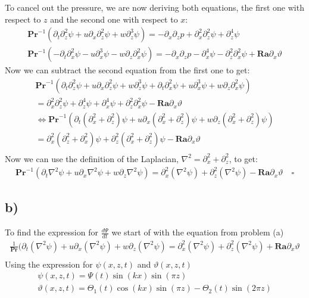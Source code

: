 \documentclass{article}
\renewcommand{\Pr}{\textbf{Pr}}
\newcommand{\Ra}{\textbf{Ra}}
\begin{document}
To cancel out the pressure, we are now deriving both equations, the first one with respect to $z$ and the second one with respect to $x$:
\begin{align*}
    \textbf{Pr}^{-1}(\partial _t \partial^2_z \psi+ u \partial_x\partial^2_z \psi+w \partial^3_z \psi)=-\partial _{x}\partial_zp+\partial ^2_x\partial_z^2\psi+\partial ^4_z\psi\\
    \textbf{Pr}^{-1}(-\partial _t \partial^2_x \psi-u \partial^3_x \psi-w \partial_z \partial^2_x \psi)=-\partial _{x}\partial_zp-\partial ^4_x\psi-\partial ^2_z\partial _x^2\psi+\textbf{Ra}\partial _x\vartheta
\end{align*}
Now we can subtract the second equation from the first one to get:
\begin{align*}
    \textbf{Pr}^{-1}(\partial _t \partial^2_z \psi+ u \partial_x\partial^2_z \psi+w \partial^3_z \psi+\partial _t \partial^2_x \psi+u \partial^3_x \psi+w \partial_z \partial^2_x \psi)\\
    =\partial ^2_x\partial_z^2\psi+\partial ^4_z\psi+\partial ^4_x\psi+\partial ^2_z\partial _x^2\psi-\textbf{Ra}\partial _x\vartheta\\
    \Leftrightarrow \textbf{Pr}^{-1}(\partial _t (\partial^2_x+ \partial^2_z) \psi+ u \partial_x(\partial_x^2+\partial_z^2) \psi+w \partial_z (\partial_x^2+\partial_z^2) \psi)\\
    =\partial _x^2(\partial_z^2+\partial_x^2)\psi+\partial _z^2(\partial_x^2+\partial_z^2)\psi-\textbf{Ra}\partial _x\vartheta\\
\end{align*}
Now we can use the definition of the Laplacian, $\nabla ^2 = \partial_x^2 + \partial_z^2$, to get:
\begin{align*}
    \textbf{Pr}^{-1}(\partial _t \nabla^2 \psi+ u \partial_x \nabla^2 \psi+w \partial_z \nabla^2 \psi)=\partial_x^2(\nabla^2\psi)+\partial_z^2(\nabla^2\psi)-\textbf{Ra}\partial _x\vartheta \quad \square 
\end{align*}


\subsection*{b)}
    To find the expression for $\frac{d\Psi}{dt}$ we start of with the equation from problem (a)
    \begin{gather}
        \frac{1}{\Pr}(\partial_t(\nabla^2 \psi) + u \partial_x(\nabla^2 \psi) + w \partial_z(\nabla^2 \psi) = \partial_x^2(\nabla^2 \psi) + \partial_z^2 (\nabla^2 \psi) + \Ra \partial_x \vartheta \\
    \end{gather}
    Using the expression for $\psi(x,z,t)$ and $\vartheta(x,z,t)$
    \begin{gather*}
        \psi(x,z,t) = \Psi(t) \sin(kx) \sin(\pi z) \\
        \vartheta(x,z,t) = \Theta_1(t) \cos(kx) \sin(\pi z) - \Theta_2(t) \sin(2\pi z) 
    \end{gather*}
    
\end{document}

